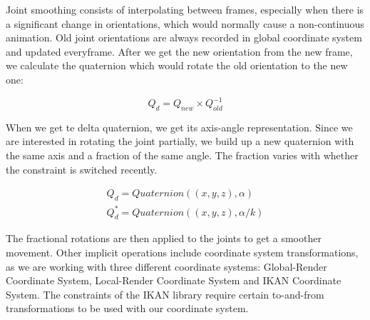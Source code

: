 Joint smoothing consists of interpolating between frames, especially when there is a significant change in orientations, which would normally cause a non-continuous animation. 
Old joint orientations are always recorded in global coordinate system and updated everyframe. After we get the new orientation from the new frame, we calculate the quaternion
which would rotate the old orientation to the new one:

\begin{equation}
Q_{d} = Q_{new} \times Q_{old}^{-1}
\label{eqn:rotator_quaternion}
\end{equation} 

When we get te delta quaternion, we get its axis-angle representation. Since we are interested in rotating the joint partially, we build up a new quaternion with the same axis and 
a fraction of the same angle. The fraction varies with whether the constraint is switched recently. 

\begin{equation} 
\begin{split}
Q_{d} = Quaternion((x,y,z),\alpha) \\  
Q_d^* = Quaternion((x,y,z), \alpha / k )
\label{eqn:partial_rotator}
\end{split}
\end{equation} 

The fractional rotations are then applied to the joints to get a smoother movement. Other implicit operations include coordinate system transformations, as we are working with three
different coordinate systems: Global-Render Coordinate System, Local-Render Coordinate System and IKAN Coordinate System. The constraints of the IKAN library require certain to-and-from  
transformations to be used with our coordinate system. 